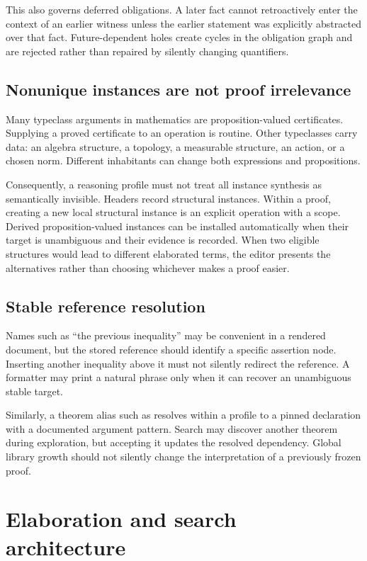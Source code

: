 \documentclass[11pt,letterpaper]{article}
\theoremstyle{definition}
\theoremstyle{remark}
\newcommand{\code}[1]{\texttt{\detokenize{#1}}}
\begin{document}
This also governs deferred obligations. A later fact cannot retroactively enter the context of an earlier witness unless the earlier statement was explicitly abstracted over that fact. Future-dependent holes create cycles in the obligation graph and are rejected rather than repaired by silently changing quantifiers.

\subsection{Nonunique instances are not proof irrelevance}
Many typeclass arguments in mathematics are proposition-valued certificates. Supplying a proved certificate to an operation is routine. Other typeclasses carry data: an algebra structure, a topology, a measurable structure, an action, or a chosen norm. Different inhabitants can change both expressions and propositions.

Consequently, a reasoning profile must not treat all instance synthesis as semantically invisible. Headers record structural instances. Within a proof, creating a new local structural instance is an explicit operation with a scope. Derived proposition-valued instances can be installed automatically when their target is unambiguous and their evidence is recorded. When two eligible structures would lead to different elaborated terms, the editor presents the alternatives rather than choosing whichever makes a proof easier.

\subsection{Stable reference resolution}
Names such as ``the previous inequality'' may be convenient in a rendered document, but the stored reference should identify a specific assertion node. Inserting another inequality above it must not silently redirect the reference. A formatter may print a natural phrase only when it can recover an unambiguous stable target.

Similarly, a theorem alias such as \code{Pascal} resolves within a profile to a pinned declaration with a documented argument pattern. Search may discover another theorem during exploration, but accepting it updates the resolved dependency. Global library growth should not silently change the interpretation of a previously frozen proof.

\section{Elaboration and search architecture}
\label{sec:architecture}
\end{document}
